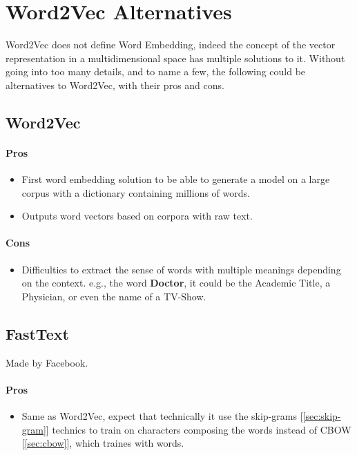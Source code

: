 \section{Word2Vec Alternatives}
Word2Vec does not define Word Embedding, indeed the concept of the vector representation in a multidimensional space has multiple solutions to it. Without going into too many details, and to name a few, the following could be alternatives to Word2Vec, with their pros and cons.

\subsection{Word2Vec\cite{article:word2vec}}
\paragraph{Pros}
\begin{itemize}
    \setlength\itemsep{0em}
    \item First word embedding solution to be able to generate a model on a large corpus with a dictionary containing millions of words.
    \item Outputs word vectors based on corpora with raw text.
\end{itemize}
\paragraph{Cons}
\begin{itemize}
    \setlength\itemsep{0em}
    \item Difficulties to extract the sense of words with multiple meanings depending on the context. e.g., the word \textbf{Doctor}, it could be the Academic Title, a Physician, or even the name of a TV-Show.
\end{itemize}

\subsection{FastText\cite{article:fasttext}}
Made by Facebook.
\paragraph{Pros}
\begin{itemize}
    \setlength\itemsep{0em}
    \item Same as Word2Vec, expect that technically it use the skip-grams [\ref{sec:skip-gram}] technics to train on characters composing the words instead of CBOW [\ref{sec:cbow}], which traines with words.
\end{itemize}
